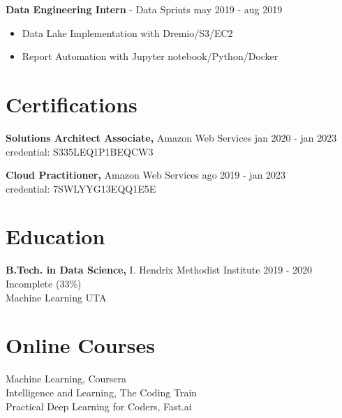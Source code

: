 \documentclass[margin]{res}
\begin{document}
\begin{resume}
    {\bf Data Engineering Intern} - Data Sprints \hfill may 2019 - aug 2019
    \begin{itemize} \itemsep -2pt
    \item Data Lake Implementation with Dremio/S3/EC2 
    \item Report Automation with Jupyter notebook/Python/Docker 
	\end{itemize}


\section{Certifications} 
    {\bf Solutions Architect Associate,} Amazon Web Services    \hfill jan 2020 - jan 2023\\
    credential: S335LEQ1P1BEQCW3  

    {\bf Cloud Practitioner,} Amazon Web Services    \hfill ago 2019 - jan 2023\\
    credential: 7SWLYYG13EQQ1E5E


\section{Education} 
    {\bf B.Tech. in Data Science,} I. Hendrix Methodist Institute \hfill 2019 - 2020 \\
    Incomplete (33\%) \\
    Machine Learning UTA


\section{Online Courses} 
Machine Learning, Coursera \\
Intelligence and Learning, The Coding Train  \\
Practical Deep Learning for Coders, Fast.ai


\end{resume} 
\end{document}
